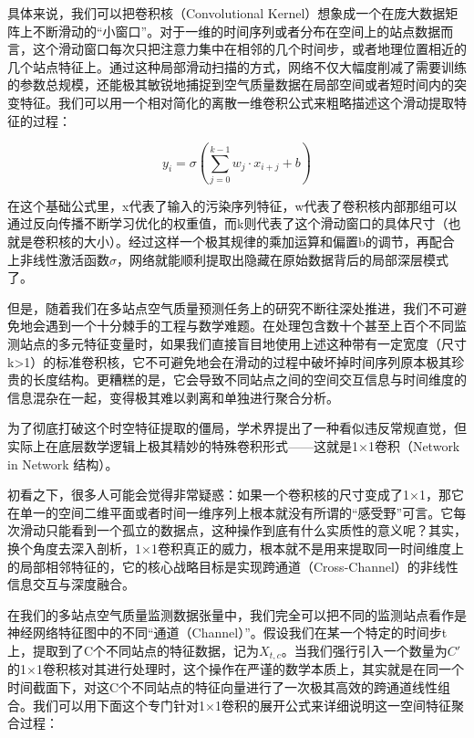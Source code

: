 具体来说，我们可以把卷积核（Convolutional Kernel）想象成一个在庞大数据矩阵上不断滑动的“小窗口”。对于一维的时间序列或者分布在空间上的站点数据而言，这个滑动窗口每次只把注意力集中在相邻的几个时间步，或者地理位置相近的几个站点特征上。通过这种局部滑动扫描的方式，网络不仅大幅度削减了需要训练的参数总规模，还能极其敏锐地捕捉到空气质量数据在局部空间或者短时间内的突变特征。我们可以用一个相对简化的离散一维卷积公式来粗略描述这个滑动提取特征的过程：

\begin{equation}\label{eq:Conv1D}
    y_i = \sigma(\sum_{j=0}^{k-1} w_j \cdot x_{i+j} + b)
\end{equation}

在这个基础公式里，x代表了输入的污染序列特征，w代表了卷积核内部那组可以通过反向传播不断学习优化的权重值，而k则代表了这个滑动窗口的具体尺寸（也就是卷积核的大小）。经过这样一个极其规律的乘加运算和偏置b的调节，再配合上非线性激活函数$\sigma$，网络就能顺利提取出隐藏在原始数据背后的局部深层模式了。

但是，随着我们在多站点空气质量预测任务上的研究不断往深处推进，我们不可避免地会遇到一个十分棘手的工程与数学难题。在处理包含数十个甚至上百个不同监测站点的多元特征变量时，如果我们直接盲目地使用上述这种带有一定宽度（尺寸k>1）的标准卷积核，它不可避免地会在滑动的过程中破坏掉时间序列原本极其珍贵的长度结构。更糟糕的是，它会导致不同站点之间的空间交互信息与时间维度的信息混杂在一起，变得极其难以剥离和单独进行聚合分析。

为了彻底打破这个时空特征提取的僵局，学术界提出了一种看似违反常规直觉，但实际上在底层数学逻辑上极其精妙的特殊卷积形式——这就是1×1卷积（Network in Network 结构）\cite{lin_network_2014}。

初看之下，很多人可能会觉得非常疑惑：如果一个卷积核的尺寸变成了1×1，那它在单一的空间二维平面或者时间一维序列上根本就没有所谓的“感受野”可言。它每次滑动只能看到一个孤立的数据点，这种操作到底有什么实质性的意义呢？其实，换个角度去深入剖析，1×1卷积真正的威力，根本就不是用来提取同一时间维度上的局部相邻特征的，它的核心战略目标是实现跨通道（Cross-Channel）的非线性信息交互与深度融合。

在我们的多站点空气质量监测数据张量中，我们完全可以把不同的监测站点看作是神经网络特征图中的不同“通道（Channel）”。假设我们在某一个特定的时间步t上，提取到了C个不同站点的特征数据，记为$X_{t,c}$。当我们强行引入一个数量为$C'$的1×1卷积核对其进行处理时，这个操作在严谨的数学本质上，其实就是在同一个时间截面下，对这C个不同站点的特征向量进行了一次极其高效的跨通道线性组合。我们可以用下面这个专门针对1×1卷积的展开公式来详细说明这一空间特征聚合过程：

